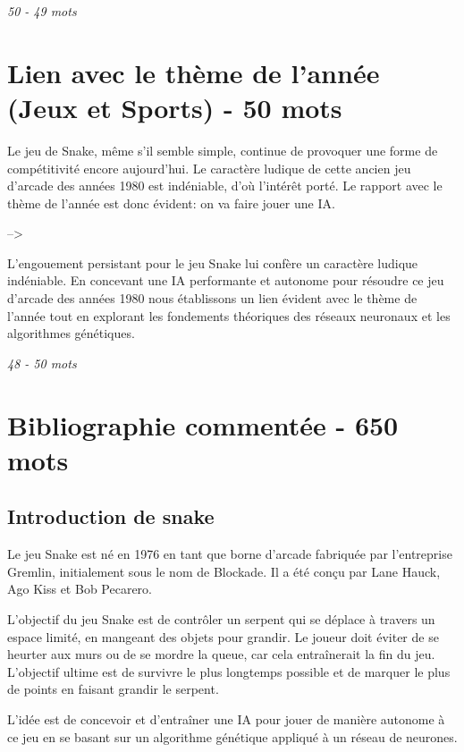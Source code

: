 \documentclass[11pt,a4paper]{article}
\begin{document}
\textit{50 - 49 mots}

\section{Lien avec le thème de l'année (Jeux et Sports) - 50 mots}

Le jeu de Snake, même s'il semble simple, continue de provoquer 
une forme de compétitivité encore aujourd'hui. 
Le caractère ludique de cette ancien jeu d'arcade des années 1980 est 
indéniable, d'où l'intérêt porté.
Le rapport avec le thème de l'année est donc évident: on va
faire jouer une IA.

--> 

L'engouement persistant pour le jeu Snake lui confère un caractère ludique indéniable. En concevant une IA performante et autonome pour résoudre ce jeu d'arcade des années 1980 nous établissons un lien évident avec le thème de l'année tout en explorant les fondements théoriques des réseaux neuronaux et les algorithmes génétiques.

\textit{48 - 50 mots}

\section{Bibliographie commentée - 650 mots}

\subsection{Introduction de snake}

Le jeu Snake est né en 1976 en tant que borne d'arcade fabriquée par l'entreprise Gremlin, initialement sous le nom de Blockade. Il a été conçu par Lane Hauck, Ago Kiss et Bob Pecarero.


L'objectif du jeu Snake est de contrôler un serpent qui se déplace à travers un espace limité, en mangeant des objets pour grandir. Le joueur doit éviter de se heurter aux murs ou de se mordre la queue, car cela entraînerait la fin du jeu. L'objectif ultime est de survivre le plus longtemps possible et de marquer le plus de points en faisant grandir le serpent.


L'idée est de concevoir et d'entraîner une IA pour jouer de manière autonome à ce jeu en se basant sur un algorithme génétique appliqué à un réseau de neurones.
\end{document}
